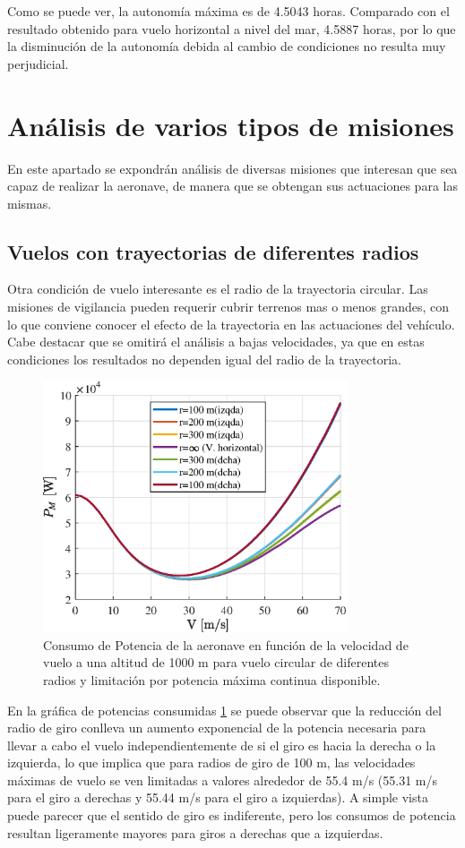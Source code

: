 Como se puede ver, la autonomía máxima es de 4.5043 horas. Comparado con el resultado obtenido para vuelo horizontal a nivel del mar, 4.5887 horas, por lo que la disminución de la autonomía debida al cambio de condiciones no resulta muy perjudicial.

\section{Análisis de varios tipos de misiones}

En este apartado se expondrán análisis de diversas misiones que interesan que sea capaz de realizar la aeronave, de manera que se obtengan sus actuaciones para las mismas.

\subsection*{Vuelos con trayectorias de diferentes radios}

Otra condición de vuelo interesante es el radio de la trayectoria circular. Las misiones de vigilancia pueden requerir cubrir terrenos mas o menos grandes, con lo que conviene conocer el efecto de la trayectoria en las actuaciones del vehículo. Cabe destacar que se omitirá el análisis a bajas velocidades, ya que en estas condiciones los resultados no dependen igual del radio de la trayectoria.

\begin{figure}
	\centering
	\includegraphics[width=90mm]{graficos/PMVCcs}
	\caption{Consumo de Potencia de la aeronave en función de la velocidad de vuelo a una altitud de 1000 m para vuelo circular de diferentes radios y limitación por potencia máxima continua disponible.}
	\label{PMVCcs}
\end{figure}

En la gráfica de potencias consumidas \ref{PMVCcs} se puede observar que la reducción del radio de giro conlleva un aumento exponencial de la potencia necesaria para llevar a cabo el vuelo independientemente de si el giro es hacia la derecha o la izquierda, lo que implica que para radios de giro de 100 m, las velocidades máximas de vuelo se ven limitadas a valores alrededor de 55.4 m/s (55.31 m/s para el giro a derechas y 55.44 m/s para el giro a izquierdas). A simple vista puede parecer que el sentido de giro es indiferente, pero los consumos de potencia resultan ligeramente mayores para giros a derechas que a izquierdas.

